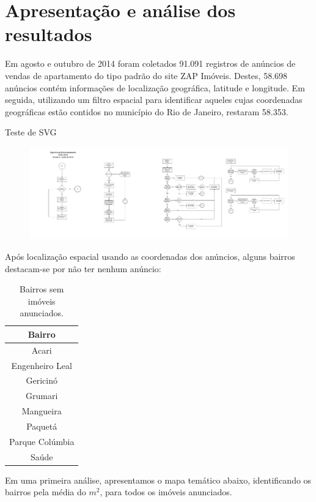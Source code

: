 \pagestyle{empty}
\cleardoublepage
\pagestyle{fancy}

\chapter{Apresentação e análise dos resultados}\label{chap:resultado}

Em agosto e outubro de 2014 foram coletados 91.091 registros de anúncios de vendas de apartamento do tipo padrão do site ZAP Imóveis. Destes, 58.698 anúncios contém informações de localização geográfica, latitude e longitude. Em seguida, utilizando um filtro espacial para identificar aqueles cujas coordenadas geográficas estão contidos no município do Rio de Janeiro, restaram 58.353.

Teste de SVG

\begin{figure}
\centering
\includegraphics[width=0.7\linewidth]{img/sdtv2}
\caption{}
\label{fig:SDT-DimensionamentoTancagem-v2}
\end{figure}



Após localização espacial usando as coordenadas dos anúncios, alguns bairros destacam-se por não ter nenhum anúncio:


\begin{table}[htp]
	\begin{center}
		\begin{tabular}{c}
		\toprule
			\textbf{Bairro}\\ \midrule			
			Acari\\
			Engenheiro Leal\\
			Gericinó\\
			Grumari\\
			Mangueira\\
			Paquetá\\
			Parque Colúmbia\\
			Saúde\\
		\bottomrule
		\end{tabular}
	\end{center}
	\caption{Bairros sem imóveis anunciados.}
	\label{tbl_bairros_sem_imovel}
\end{table}

Em uma primeira análise, apresentamos o mapa temático abaixo, identificando os bairros pela média do $m^2$, para todos os imóveis anunciados.

